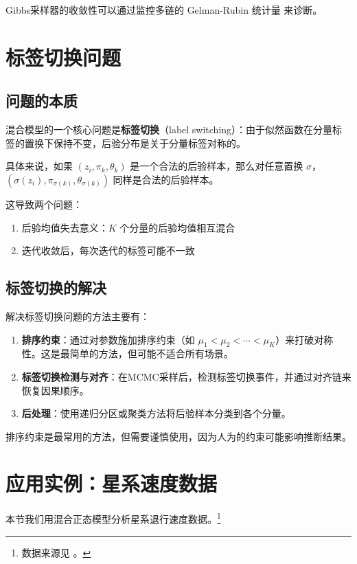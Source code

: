 Gibbs采样器的收敛性可以通过监控多链的 Gelman-Rubin 统计量 \cite{GelmanRubin1992} 来诊断。

\section{标签切换问题}

\subsection{问题的本质}

混合模型的一个核心问题是\textbf{标签切换}（label switching）：由于似然函数在分量标签的置换下保持不变，后验分布是关于分量标签对称的。

具体来说，如果 $(z_i, \pi_k, \theta_k)$ 是一个合法的后验样本，那么对任意置换 $\sigma$，$(\sigma(z_i), \pi_{\sigma(k)}, \theta_{\sigma(k)})$ 同样是合法的后验样本。

这导致两个问题：
\begin{enumerate}
  \item 后验均值失去意义：$K$ 个分量的后验均值相互混合
  \item 迭代收敛后，每次迭代的标签可能不一致
\end{enumerate}

\subsection{标签切换的解决}

解决标签切换问题的方法主要有：

\begin{enumerate}
  \item \textbf{排序约束}：通过对参数施加排序约束（如 $\mu_1 < \mu_2 < \cdots < \mu_K$）来打破对称性。这是最简单的方法，但可能不适合所有场景。
  \item \textbf{标签切换检测与对齐}：在MCMC采样后，检测标签切换事件，并通过对齐链来恢复因果顺序。
  \item \textbf{后处理}：使用递归分区或聚类方法将后验样本分类到各个分量。
\end{enumerate}

排序约束是最常用的方法，但需要谨慎使用，因为人为的约束可能影响推断结果。

\section{应用实例：星系速度数据}

本节我们用混合正态模型分析星系退行速度数据。\footnote{数据来源见 \cite{ROBERT1995}。}

